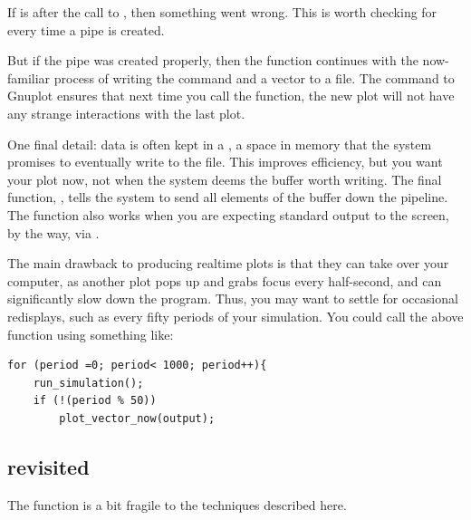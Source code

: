 If  is  after the call to , then something
went wrong.  This is worth checking for every time a pipe is created.

But if the pipe was created
properly, then the function continues with the now-familiar process of
writing the command  and a vector to a file. The 
command to Gnuplot ensures that next time you call the function, the new
plot will not have any strange interactions with the last plot.

One final detail: data is often kept in a , a space in
memory that the system promises to eventually write to the file. This
improves efficiency, but you want your plot now, not when the system
deems the buffer worth writing.  The final
function, , tells the system to send all elements of the
 buffer down the pipeline. The function also works when you are
expecting standard
output to the screen, by the way, via .

The main drawback to producing realtime plots is that they can take over
your computer, as another plot pops up and grabs focus every half-second, and can significantly slow down the program.
Thus, you may want to settle for occasional redisplays, such as every
fifty periods of your simulation. You could call the above
function using something like:

\begin{lstlisting}
for (period =0; period< 1000; period++){
    run_simulation();
    if (!(period % 50))
        plot_vector_now(output);
\end{lstlisting}


\subsection{\treesymbol{}  revisited}\label{replottwo}
The  function is a bit fragile to the techniques described
here.

